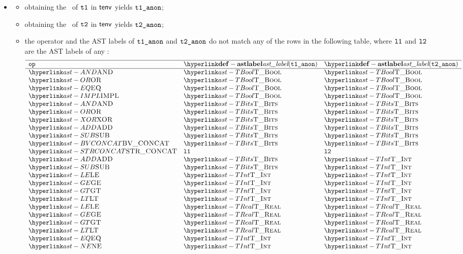 \begin{itemize}
  \item {}
  \begin{itemize}
    \item obtaining the \underlyingtype\ of $\texttt{t1}$ in $\textsf{tenv}$ yields $\texttt{t1\_anon}$\ProseOrTypeError;
    \item obtaining the \underlyingtype\ of $\texttt{t2}$ in $\textsf{tenv}$ yields $\texttt{t2\_anon}$\ProseOrTypeError;
    \item the operator and the AST labels of $\texttt{t1\_anon}$ and $\texttt{t2\_anon}$ do not match any of the rows in the following table,
    where $\texttt{l1}$ and $\texttt{l2}$ are the AST labels of any \Prosesingulartypes{}:
    \[
    \begin{array}{lll}
      \hline
      \mathbf{\op} & \mathbf{\astlabel(\vtoneanon)} & \mathbf{\astlabel(\vttwoanon)} \\
      \hline
      \AND     & \TBool  & \TBool\\
      \OR      & \TBool  & \TBool\\
      \EQ    & \TBool  & \TBool\\
      \IMPL    & \TBool  & \TBool\\
      \AND     & \TBits  & \TBits\\
      \OR      & \TBits  & \TBits\\
      \XOR     & \TBits  & \TBits\\
      \ADD    & \TBits  & \TBits\\
      \SUB   & \TBits  & \TBits\\
      \BVCONCAT& \TBits  & \TBits\\
      \STRCONCAT& \vlone  & \vltwo\\
      \ADD    & \TBits  & \TInt\\
      \SUB   & \TBits  & \TInt\\
      \LE     & \TInt     & \TInt\\
      \GE     & \TInt     & \TInt\\
      \GT      & \TInt     & \TInt\\
      \LT      & \TInt     & \TInt\\
      \LE     & \TReal    & \TReal\\
      \GE     & \TReal    & \TReal\\
      \GT      & \TReal    & \TReal\\
      \LT      & \TReal    & \TReal\\
      \EQ    & \TInt     & \TInt\\
      \NE     & \TInt     & \TInt\\

\end{array}\]
\end{itemize}
\end{itemize}
